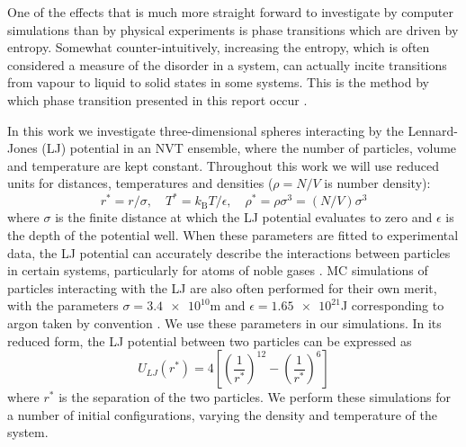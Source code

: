 \documentclass[10pt, twocolumn]{revtex4}    %
\begin{document}
One of the effects that is much more straight forward to investigate by computer simulations than by physical experiments is phase transitions which are driven by entropy. Somewhat counter-intuitively, increasing the entropy, which is often considered a measure of the disorder in a system, can actually incite transitions from vapour to liquid to solid states in some systems. This is the method by which phase transition presented in this report occur \cite{Frenkel, Hansen2}.

In this work we investigate three-dimensional spheres interacting by the Lennard-Jones (LJ) potential in an NVT ensemble, where the number of particles, volume and temperature are kept constant. Throughout this work we will use reduced units for distances, temperatures and densities ($\rho{}=N/V$ is number density):
\begin{displaymath}
r^{*} = r/\sigma{},\quad{}
T^{*} = k_\text{B}T/\epsilon{},\quad{}
\rho{}^{*} = \rho{}\sigma{}^{3} = (N/V)\sigma{}^{3}
\end{displaymath}
where $\sigma{}$ is the finite distance at which the LJ potential evaluates to zero and $\epsilon{}$ is the depth of the potential well. When these parameters are fitted to experimental data, the LJ potential can accurately describe the interactions between particles in certain systems, particularly for atoms of noble gases \cite{SimpleLiquids}. MC simulations of particles interacting with the LJ are also often performed for their own merit, with the parameters $\sigma=\num{3.4e10}$m and $\epsilon=\num{1.65e21}$J corresponding to argon taken by convention \cite{WoodParker}. We use these parameters in our simulations.
In its reduced form, the LJ potential between two particles can be expressed as
\begin{equation}
U_{LJ}(r^{*}) = 4\left[\left(\frac{1}{r^{*}}\right)^{12}-\left(\frac{1}{r^{*}}\right)^{6}\right]
\end{equation}
where $r^{*}$ is the separation of the two particles.
We perform these simulations for a number of initial configurations, varying the density and temperature of the system.
\end{document}
